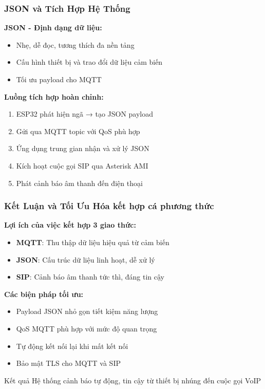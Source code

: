 \begin{frame}
\frametitle{JSON và Tích Hợp Hệ Thống}

\textbf{JSON - Định dạng dữ liệu:}
\begin{itemize}
\item Nhẹ, dễ đọc, tương thích đa nền tảng
\item Cấu hình thiết bị và trao đổi dữ liệu cảm biến
\item Tối ưu payload cho MQTT
\end{itemize}

\textbf{Luồng tích hợp hoàn chỉnh:}
\begin{enumerate}
\item ESP32 phát hiện ngã → tạo JSON payload
\item Gửi qua MQTT topic với QoS phù hợp  
\item Ứng dụng trung gian nhận và xử lý JSON
\item Kích hoạt cuộc gọi SIP qua Asterisk AMI
\item Phát cảnh báo âm thanh đến điện thoại
\end{enumerate}
\end{frame}

\begin{frame}
\frametitle{Kết Luận và Tối Ưu Hóa kết hợp cá phương thức}

\textbf{Lợi ích của việc kết hợp 3 giao thức:}
\begin{itemize}
\item \textbf{MQTT}: Thu thập dữ liệu hiệu quả từ cảm biến
\item \textbf{JSON}: Cấu trúc dữ liệu linh hoạt, dễ xử lý
\item \textbf{SIP}: Cảnh báo âm thanh tức thì, đáng tin cậy
\end{itemize}

\textbf{Các biện pháp tối ưu:}
\begin{itemize}
\item Payload JSON nhỏ gọn tiết kiệm năng lượng
\item QoS MQTT phù hợp với mức độ quan trọng
\item Tự động kết nối lại khi mất kết nối
\item Bảo mật TLS cho MQTT và SIP
\end{itemize}

\begin{block}{Kết quả}
Hệ thống cảnh báo tự động, tin cậy từ thiết bị nhúng đến cuộc gọi VoIP
\end{block}
\end{frame}

